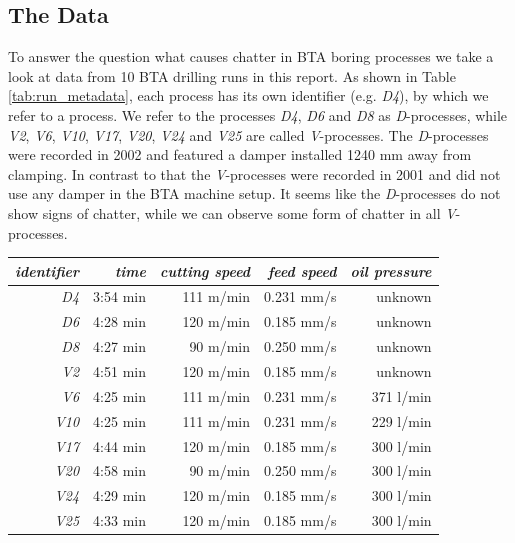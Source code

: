 \documentclass[12 pt]{scrartcl}
\begin{document}


\subsection{The Data}

To answer the question what causes chatter in BTA boring processes we take a look at data from 10 BTA drilling runs in this report.
As shown in Table \ref{tab:run_metadata}, each process has its own identifier (e.g. \emph{D4}), by which we refer to a process.
We refer to the processes \emph{D4}, \emph{D6} and \emph{D8} as \emph{D}-processes, while \emph{V2}, \emph{V6}, \emph{V10}, \emph{V17}, \emph{V20}, \emph{V24} and \emph{V25} are called \emph{V}-processes.
The \emph{D}-processes were recorded in 2002 and featured a damper installed 1240 mm away from clamping. In contrast to that the \emph{V}-processes were recorded in 2001 and did not use any damper in the BTA machine setup. It seems like the \emph{D}-processes do not show signs of chatter, while we can observe some form of chatter in all \emph{V}-processes.


\begin{table}[ht]
  \centering
  \label{tab:causes}
  \begin{tabular}{r|rrrr}
    \emph{identifier} & \emph{time} & \emph{cutting speed} & \emph{feed speed} & \emph{oil pressure} \\
    \hline
    \emph{D4}         & 3:54 min    & 111 m/min            & 0.231 mm/s        & unknown             \\
    \emph{D6}         & 4:28 min    & 120 m/min            & 0.185 mm/s        & unknown             \\
    \emph{D8}         & 4:27 min    & 90 m/min             & 0.250 mm/s        & unknown             \\
    \emph{V2}         & 4:51 min    & 120 m/min            & 0.185 mm/s        & unknown             \\
    \emph{V6}         & 4:25 min    & 111 m/min            & 0.231 mm/s        & 371 l/min           \\
    \emph{V10}        & 4:25 min    & 111 m/min            & 0.231 mm/s        & 229 l/min           \\
    \emph{V17}        & 4:44 min    & 120 m/min            & 0.185 mm/s        & 300 l/min           \\
    \emph{V20}        & 4:58 min    & 90 m/min             & 0.250 mm/s        & 300 l/min           \\
    \emph{V24}        & 4:29 min    & 120 m/min            & 0.185 mm/s        & 300 l/min           \\
    \emph{V25}        & 4:33 min    & 120 m/min            & 0.185 mm/s        & 300 l/min           \\
  \end{tabular}
\end{table}
\end{document}
